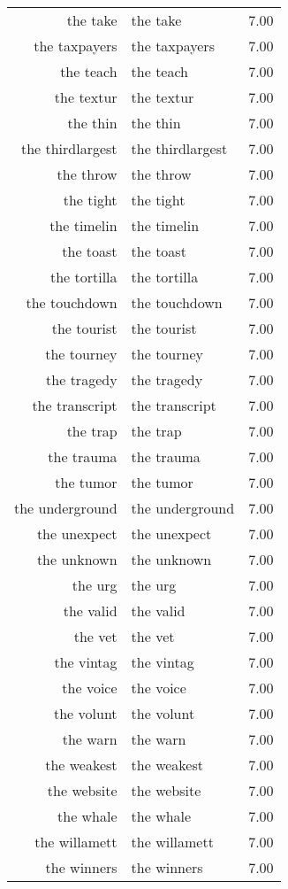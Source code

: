 \begin{table}[ht]
\begin{tabular}{rlr}
  the take & the take & 7.00 \\ 
  the taxpayers & the taxpayers & 7.00 \\ 
  the teach & the teach & 7.00 \\ 
  the textur & the textur & 7.00 \\ 
  the thin & the thin & 7.00 \\ 
  the thirdlargest & the thirdlargest & 7.00 \\ 
  the throw & the throw & 7.00 \\ 
  the tight & the tight & 7.00 \\ 
  the timelin & the timelin & 7.00 \\ 
  the toast & the toast & 7.00 \\ 
  the tortilla & the tortilla & 7.00 \\ 
  the touchdown & the touchdown & 7.00 \\ 
  the tourist & the tourist & 7.00 \\ 
  the tourney & the tourney & 7.00 \\ 
  the tragedy & the tragedy & 7.00 \\ 
  the transcript & the transcript & 7.00 \\ 
  the trap & the trap & 7.00 \\ 
  the trauma & the trauma & 7.00 \\ 
  the tumor & the tumor & 7.00 \\ 
  the underground & the underground & 7.00 \\ 
  the unexpect & the unexpect & 7.00 \\ 
  the unknown & the unknown & 7.00 \\ 
  the urg & the urg & 7.00 \\ 
  the valid & the valid & 7.00 \\ 
  the vet & the vet & 7.00 \\ 
  the vintag & the vintag & 7.00 \\ 
  the voice & the voice & 7.00 \\ 
  the volunt & the volunt & 7.00 \\ 
  the warn & the warn & 7.00 \\ 
  the weakest & the weakest & 7.00 \\ 
  the website & the website & 7.00 \\ 
  the whale & the whale & 7.00 \\ 
  the willamett & the willamett & 7.00 \\ 
  the winners & the winners & 7.00 \\ 

\end{tabular}
\end{table}
